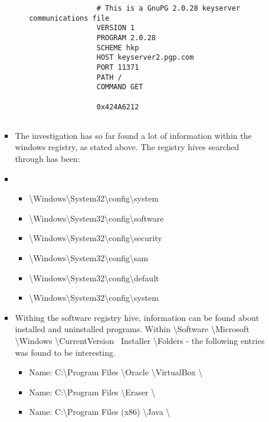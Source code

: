 \begin{enumerate}
\begin{itemize}
\begin{itemize}
\begin{itemize}
				\begin{lstlisting}
				# This is a GnuPG 2.0.28 keyserver communications file
				VERSION 1
				PROGRAM 2.0.28
				SCHEME hkp
				HOST keyserver2.pgp.com
				PORT 11371
				PATH /
				COMMAND GET
				
				0x424A6212
				
				\end{lstlisting}
				
			\end{itemize}	
			
			
		\item The investigation has so far found a lot of information within the windows registry, as stated above. The registry hives searched through has been:
		
		\item 
		\begin{itemize}
			\item \textbackslash Windows\textbackslash System32\textbackslash config\textbackslash system\\ 
			\item \textbackslash Windows\textbackslash System32\textbackslash config\textbackslash software\\
			\item \textbackslash Windows\textbackslash System32\textbackslash config\textbackslash security\\
			\item \textbackslash Windows\textbackslash System32\textbackslash config\textbackslash sam \\
			\item \textbackslash Windows\textbackslash System32\textbackslash config\textbackslash default \\
			\item \textbackslash Windows\textbackslash System32\textbackslash config\textbackslash system \\
		\end{itemize} 
		
		\item Withing the software registry hive, information can be found about installed and uninstalled programs. Within \textbackslash Software \textbackslash Microsoft \textbackslash Windows \textbackslash CurrentVersion \ Installer \textbackslash Folders - the following entries was found to be interesting.
		
		\begin{itemize} 
			\item Name: C:\textbackslash Program Files \textbackslash Oracle \textbackslash VirtualBox \textbackslash
			\item Name: C:\textbackslash Program Files \textbackslash Eraser \textbackslash
			\item Name: C:\textbackslash Program Files (x86) \textbackslash Java \textbackslash\\
		\end{itemize}
		

\end{itemize}
\end{itemize}
\end{enumerate}
